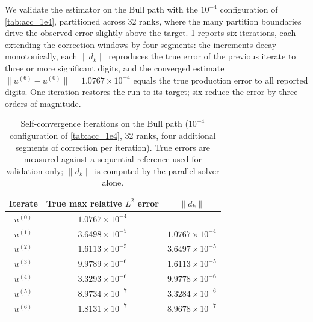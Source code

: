 We validate the estimator on the Bull path with the $10^{-4}$ configuration
of \cref{tab:acc_1e4}, partitioned across 32 ranks, where the many partition
boundaries drive the observed error slightly above the target.
\cref{tab:self_convergence} reports six iterations, each extending the
correction windows by four segments: the
increments decay monotonically, each $\|d_k\|$ reproduces the true error of
the previous iterate to three or more significant digits, and the converged
estimate $\|u^{(6)} - u^{(0)}\| = 1.0767\times10^{-4}$ equals the true
production error to all reported digits. One iteration restores the run to
its target; six reduce the error by three orders of magnitude.

\begin{table}[h]
\centering
\caption{Self-convergence iterations on the Bull path ($10^{-4}$
configuration of \cref{tab:acc_1e4}, 32 ranks, four additional segments of
correction per iteration). True errors are
measured against a sequential reference used for validation only; $\|d_k\|$
is computed by the parallel solver alone.}
\label{tab:self_convergence}
\begin{tabular}{ccc}
\hline
Iterate & True max relative $L^2$ error & $\|d_k\|$ \\
\hline
$u^{(0)}$ & $1.0767\times10^{-4}$ & --- \\
$u^{(1)}$ & $3.6498\times10^{-5}$ & $1.0767\times10^{-4}$ \\
$u^{(2)}$ & $1.6113\times10^{-5}$ & $3.6497\times10^{-5}$ \\
$u^{(3)}$ & $9.9789\times10^{-6}$ & $1.6113\times10^{-5}$ \\
$u^{(4)}$ & $3.3293\times10^{-6}$ & $9.9778\times10^{-6}$ \\
$u^{(5)}$ & $8.9734\times10^{-7}$ & $3.3284\times10^{-6}$ \\
$u^{(6)}$ & $1.8131\times10^{-7}$ & $8.9678\times10^{-7}$ \\
\hline
\end{tabular}
\end{table}
